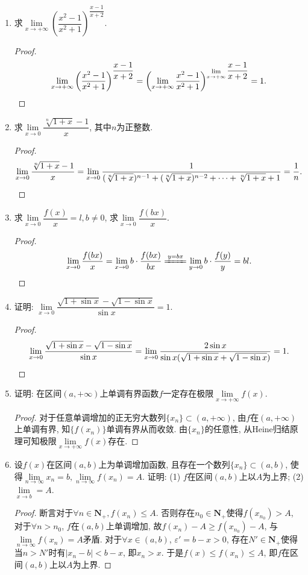 \documentclass[a4paper,11pt,twoside]{ctexbook}
\begin{document}
\begin{enumerate}
	\item 求$\lim\limits_{x\to+\infty} \left(\dfrac{x^2-1}{x^2+1}\right)^{\dfrac{x-1}{x+2}}$.
	      \begin{proof}
		      \[
			      \lim\limits_{x\to+\infty} \left(\dfrac{x^2-1}{x^2+1}\right)^{\dfrac{x-1}{x+2}}=\left(\lim\limits_{x\to+\infty} \dfrac{x^2-1}{x^2+1}\right)^{\lim\limits_{x\to+\infty} \dfrac{x-1}{x+2}}=1. \qedhere
		      \]
	      \end{proof}

	\item 求$\lim\limits_{x\to 0} \dfrac{\sqrt[n]{1+x}-1}{x}$, 其中$n$为正整数.
	      \begin{proof}
		      \[
			      \lim\limits_{x\to 0} \dfrac{\sqrt[n]{1+x}-1}{x}=\lim\limits_{x\to 0}\dfrac{1}{(\sqrt[n]{1+x})^{n-1}+(\sqrt[n]{1+x})^{n-2}+\cdots+\sqrt[n]{1+x}+1}=\dfrac{1}{n}. \qedhere
		      \]
	      \end{proof}

	\item 求$\lim\limits_{x\to 0} \dfrac{f(x)}{x}=l, b\neq 0$, 求$\lim\limits_{x\to 0} \dfrac{f(bx)}{x}$.
	      \begin{proof}
		      \[
			      \lim\limits_{x\to 0} \dfrac{f(bx)}{x}=\lim\limits_{x\to 0} b\cdot\dfrac{f(bx)}{bx}\xlongequal{y=bx}\lim\limits_{y\to 0} b\cdot\dfrac{f(y)}{y}=bl. \qedhere
		      \]
	      \end{proof}

	\item 证明: $\lim\limits_{x\to 0} \dfrac{\sqrt{1+\sin{x}}-\sqrt{1-\sin{x}}}{\sin{x}}=1$.
	      \begin{proof}
		      \[
			      \lim\limits_{x\to 0} \dfrac{\sqrt{1+\sin{x}}-\sqrt{1-\sin{x}}}{\sin{x}}=\lim\limits_{x\to 0} \dfrac{2\sin{x}}{\sin{x}(\sqrt{1+\sin{x}}+\sqrt{1-\sin{x}})}=1. \qedhere
		      \]
	      \end{proof}

	\item 证明: 在区间$(a,+\infty)$上单调有界函数$f$一定存在极限$\lim\limits_{x\to+\infty} f(x)$.
	      \begin{proof}
		      对于任意单调增加的正无穷大数列$\{x_n\}\subset(a,+\infty)$, 由$f$在$(a,+\infty)$上单调有界, 知$\{f(x_n)\}$单调有界从而收敛. 由$\{x_n\}$的任意性, 从Heine归结原理可知极限$\lim\limits_{x\to+\infty} f(x)$存在. \qedhere
	      \end{proof}

	\item 设$f(x)$在区间$(a,b)$上为单调增加函数, 且存在一个数列$\{x_n\}\subset(a,b)$, 使得$\lim\limits_{n\to\infty} x_n=b, \lim\limits_{n\to\infty} f(x_n)=A$. 证明: (1) $f$在区间$(a,b)$上以$A$为上界; (2) $\lim\limits_{x\to b}=A$.
	      \begin{proof}
		      断言对于$\forall n\in\mathbf{N}_{+}, f(x_n)\leqslant A$. 否则存在$n_0\in\mathbf{N}_{+}$使得$f(x_{n_0})>A$, 对于$\forall n>n_0$, $f$在$(a,b)$上单调增加, 故$f(x_n)-A\geqslant f(x_{n_0})-A$, 与$\lim\limits_{n\to\infty} f(x_n)=A$矛盾. 对于$\forall x\in(a,b)$, $\varepsilon'=b-x>0$, 存在$N'\in\mathbf{N}_{+}$使得当$n>N'$时有$|x_n-b|<b-x$, 即$x_n>x$. 于是$f(x)\leqslant f(x_n)\leqslant A$, 即$f$在区间$(a,b)$上以$A$为上界.


\end{proof}
\end{enumerate}
\end{document}
